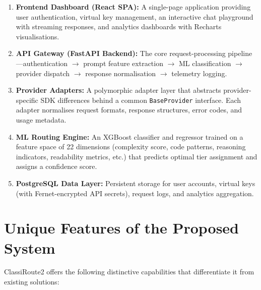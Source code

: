 \documentclass[12pt,a4paper]{report}
\begin{document}
\begin{enumerate}[nosep]
    \item \textbf{Frontend Dashboard (React SPA):} A single-page application providing user authentication, virtual key management, an interactive chat playground with streaming responses, and analytics dashboards with Recharts visualisations.
    \item \textbf{API Gateway (FastAPI Backend):} The core request-processing pipeline---authentication $\rightarrow$ prompt feature extraction $\rightarrow$ ML classification $\rightarrow$ provider dispatch $\rightarrow$ response normalisation $\rightarrow$ telemetry logging.
    \item \textbf{Provider Adapters:} A polymorphic adapter layer that abstracts provider-specific SDK differences behind a common \texttt{BaseProvider} interface. Each adapter normalises request formats, response structures, error codes, and usage metadata.
    \item \textbf{ML Routing Engine:} An XGBoost classifier and regressor trained on a feature space of 22 dimensions (complexity score, code patterns, reasoning indicators, readability metrics, etc.) that predicts optimal tier assignment and assigns a confidence score.
    \item \textbf{PostgreSQL Data Layer:} Persistent storage for user accounts, virtual keys (with Fernet-encrypted API secrets), request logs, and analytics aggregation.
\end{enumerate}

\section{Unique Features of the Proposed System}

ClassiRoute2 offers the following distinctive capabilities that differentiate it from existing solutions:
\end{document}
